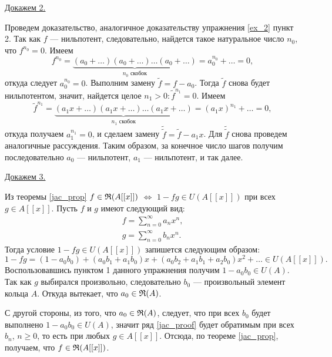     \underline{Докажем 2.}
    \begin{Proof}
        
        Проведем доказательство, аналогичное доказательству упражнения \ref{ex_2} пункт 2. Так как $f$ --- нильпотент, следовательно, найдется такое 
        натуральное число $n_0$, что $f^{n_0} = 0$. Имеем 
        $$
            f^{n_0} = \underbrace{(a_0 + \dots )(a_0 + \dots )\dots (a_0 + \dots )}_{n_0 \text{ скобок}} = a_0^{n_0} + \dots = 0,
        $$
        откуда следует $a_0^{n_0} = 0$. Выполним замену $\tilde{f} = f - a_0$. Тогда $\tilde{f}$ снова будет нильпотентом, значит, найдется целое $n_1 > 0 : \tilde{f}^{n_1} = 0$. Имеем
        $$
            \tilde{f}^{n_1} = \underbrace{(a_1x + \dots )(a_1x + \dots )\dots (a_1x + \dots )}_{n_1 \text{ скобок}} = (a_1x)^{n_1} + \dots = 0,
        $$
        откуда получаем $a_1^{n_1} = 0$, и сделаем замену $\tilde{\tilde{f}} = \tilde{f} - a_1x$. Для $\tilde{\tilde{f}}$ снова проведем аналогичные рассуждения. 
        Таким образом, за конечное число шагов получим последовательно $a_0$ --- нильпотент, $a_1$ --- нильпотент, и так далее.
    \end{Proof}
    \underline{Докажем 3.}
    \begin{Proof}

        Из теоремы \ref{jac_prop} $f \in \mathfrak{R}(A[[x]])$ $\Leftrightarrow$ $1 - fg \in U(A[[x]])$ при всех $g \in A[[x]]$. Пусть $f$ и $g$ имеют следующий вид:
        \begin{align*}
            f = \sum_{n=0}^\infty a_nx^n,\\
            g = \sum_{n=0}^\infty b_nx^n.
        \end{align*}
        Тогда условие $1 - fg \in U(A[[x]])$ запишется следующим образом:
        \begin{equation} \label{jac_proof}
            1 - fg = (1 - a_0b_0) + (a_0b_1 + a_1b_0)x + (a_0b_2 + a_1b_1 + a_2b_0)x^2 + \dots \in U(A[[x]]).
        \end{equation}
        Воспользовавшись пунктом 1 данного упражнения получим $1 - a_0b_0 \in U(A)$. Так как $g$ выбирался произвольно, следовательно $b_0$ --- произвольный элемент кольца $A$.
        Откуда вытекает, что $a_0 \in \mathfrak{R}(A)$.

        С другой стороны, из того, что $a_0 \in \mathfrak{R}(A)$, следует, что при всех $b_0$ будет выполнено $1 - a_0b_0 \in U(A)$, значит ряд \eqref{jac_proof} 
        будет обратимым при всех $b_n$, $n \geqslant 0$, то есть при любых $g \in A[[x]]$. Отсюда, по теореме \ref{jac_prop}, получаем, что $f \in \mathfrak{R}(A[[x]])$.
    \end{Proof}

